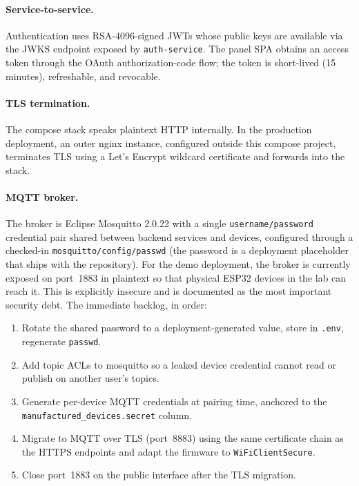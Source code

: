 \documentclass[a4paper,12pt]{article}
\begin{document}
\paragraph{Service-to-service.} Authentication uses RSA-4096-signed JWTs whose public keys are available via the JWKS endpoint exposed by \verb|auth-service|. The panel SPA obtains an access token through the OAuth authorization-code flow; the token is short-lived (15 minutes), refreshable, and revocable.

\paragraph{TLS termination.} The compose stack speaks plaintext HTTP internally. In the production deployment, an outer nginx instance, configured outside this compose project, terminates TLS using a Let's Encrypt wildcard certificate and forwards into the stack.

\paragraph{MQTT broker.} The broker is Eclipse Mosquitto 2.0.22 with a single \verb|username/password| credential pair shared between backend services and devices, configured through a checked-in \verb|mosquitto/config/passwd| (the password is a deployment placeholder that ships with the repository). For the demo deployment, the broker is currently exposed on port~1883 in plaintext so that physical ESP32 devices in the lab can reach it. This is explicitly insecure and is documented as the most important security debt. The immediate backlog, in order:

\begin{enumerate}
  \item Rotate the shared password to a deployment-generated value, store in \verb|.env|, regenerate \verb|passwd|.
  \item Add topic ACLs to mosquitto so a leaked device credential cannot read or publish on another user's topics.
  \item Generate per-device MQTT credentials at pairing time, anchored to the \verb|manufactured_devices.secret| column.
  \item Migrate to MQTT over TLS (port~8883) using the same certificate chain as the HTTPS endpoints and adapt the firmware to \verb|WiFiClientSecure|.
  \item Close port~1883 on the public interface after the TLS migration.
\end{enumerate}
\end{document}

